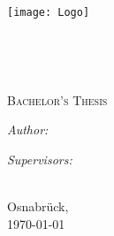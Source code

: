 \documentclass[11pt, oneside, english, singlespacing, %
headsepline, %
]{MastersDoctoralThesis}
\author{Christoph Stenkamp} %
\begin{document}
	
	\frontmatter %
	
	\pagestyle{plain} %
	


	\begin{titlepage}
		\begin{center}
			
			\texttt{[image: Logo]} %
			
			\vspace*{.06\textheight}
			\HRule \\[0.4cm] %
			{\huge \bfseries \ttitle\par}\vspace{0.4cm} %
			\HRule \\[1.5cm] %
			
			{\scshape\LARGE \univname\par}\vspace{.5cm} %
			
			{\scshape\Large \deptname \par}\vspace{1.5cm}
			
			\textsc{\Large Bachelor's Thesis}\\[0.5cm] %
			
			\vspace*{.1\textheight} 
			\begin{minipage}[t]{0.4\textwidth}
				\begin{flushleft} \large
					\emph{Author:}\\
					\authorname %
				\end{flushleft}
			\end{minipage}
			\begin{minipage}[t]{0.4\textwidth}
				\begin{flushright} \large
					\emph{Supervisors:} \\
					\supname %
				\end{flushright}
			\end{minipage}\\[3cm]

			\vfill
			Osnabrück,\\
			\today
			
		\end{center}
	\end{titlepage}	
\end{document}
